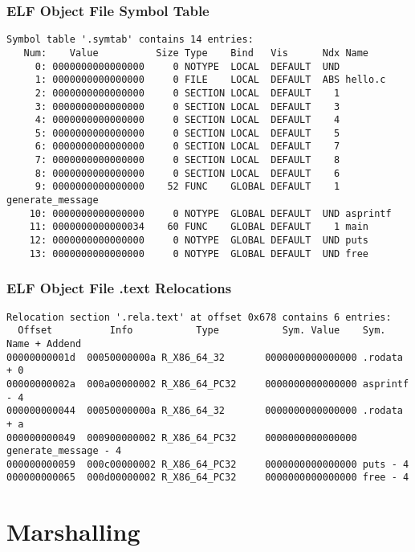 \documentclass{beamer}
\begin{document}
\begin{frame}[fragile]
    \frametitle{ELF Object File Symbol Table}
    \begin{tiny}
     \begin{verbatim}
Symbol table '.symtab' contains 14 entries:
   Num:    Value          Size Type    Bind   Vis      Ndx Name
     0: 0000000000000000     0 NOTYPE  LOCAL  DEFAULT  UND
     1: 0000000000000000     0 FILE    LOCAL  DEFAULT  ABS hello.c
     2: 0000000000000000     0 SECTION LOCAL  DEFAULT    1
     3: 0000000000000000     0 SECTION LOCAL  DEFAULT    3
     4: 0000000000000000     0 SECTION LOCAL  DEFAULT    4
     5: 0000000000000000     0 SECTION LOCAL  DEFAULT    5
     6: 0000000000000000     0 SECTION LOCAL  DEFAULT    7
     7: 0000000000000000     0 SECTION LOCAL  DEFAULT    8
     8: 0000000000000000     0 SECTION LOCAL  DEFAULT    6
     9: 0000000000000000    52 FUNC    GLOBAL DEFAULT    1 generate_message
    10: 0000000000000000     0 NOTYPE  GLOBAL DEFAULT  UND asprintf
    11: 0000000000000034    60 FUNC    GLOBAL DEFAULT    1 main
    12: 0000000000000000     0 NOTYPE  GLOBAL DEFAULT  UND puts
    13: 0000000000000000     0 NOTYPE  GLOBAL DEFAULT  UND free
    \end{verbatim}
    \end{tiny}
\end{frame}

\begin{frame}[fragile]
    \frametitle{ELF Object File .text Relocations}
    \begin{tiny}
        \begin{verbatim}
Relocation section '.rela.text' at offset 0x678 contains 6 entries:
  Offset          Info           Type           Sym. Value    Sym. Name + Addend
00000000001d  00050000000a R_X86_64_32       0000000000000000 .rodata + 0
00000000002a  000a00000002 R_X86_64_PC32     0000000000000000 asprintf - 4
000000000044  00050000000a R_X86_64_32       0000000000000000 .rodata + a
000000000049  000900000002 R_X86_64_PC32     0000000000000000 generate_message - 4
000000000059  000c00000002 R_X86_64_PC32     0000000000000000 puts - 4
000000000065  000d00000002 R_X86_64_PC32     0000000000000000 free - 4
        \end{verbatim}
    \end{tiny}
\end{frame}


\section{Marshalling}
\end{document}
